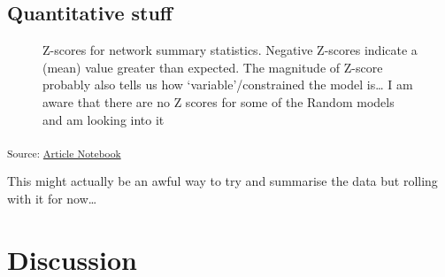 \documentclass[
  letterpaper,
  DIV=11,
  numbers=noendperiod]{scrartcl}
\begin{document}
\subsection{Quantitative stuff}\label{quantitative-stuff}

\begin{figure}[H]


\caption{\label{fig-topology}Z-scores for network summary statistics.
Negative Z-scores indicate a (mean) value greater than expected. The
magnitude of Z-score probably also tells us how `variable'/constrained
the model is\ldots{} I am aware that there are no Z scores for some of
the Random models and am looking into it}

\end{figure}%

\textsubscript{Source:
\href{https://BecksLab.github.io/ms_t_is_for_topology/index.qmd.html}{Article
Notebook}}

This might actually be an awful way to try and summarise the data but
rolling with it for now\ldots{}

\section{Discussion}\label{discussion}
\end{document}
